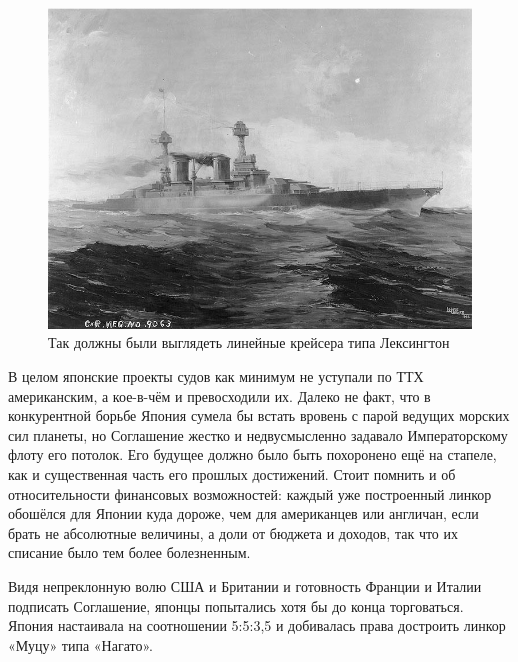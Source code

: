 \begin{figure}[h!tb] 
	\centering\includegraphics[scale=0.5]{Glava7/x1T2QXuUh1k.jpg}
	\caption{Так должны были выглядеть линейные крейсера типа Лексингтон}%
\end{figure}

В целом японские проекты судов как минимум не уступали по ТТХ американским, а кое-в-чём и превосходили их. Далеко не факт, что в конкурентной борьбе Япония сумела бы встать вровень с парой ведущих морских сил планеты, но Соглашение жестко и недвусмысленно задавало Императорскому флоту его потолок. Его будущее должно было быть похоронено ещё на стапеле, как и существенная часть его прошлых достижений. Стоит помнить и об относительности финансовых возможностей: каждый уже построенный линкор обошёлся для Японии куда дороже, чем для американцев или англичан, если брать не абсолютные величины, а доли от бюджета и доходов, так что их списание было тем более болезненным.

Видя непреклонную волю США и Британии и готовность Франции и Италии подписать Соглашение, японцы попытались хотя бы до конца торговаться. Япония настаивала на соотношении 5:5:3,5 и добивалась права достроить линкор «Муцу» типа «Нагато».

